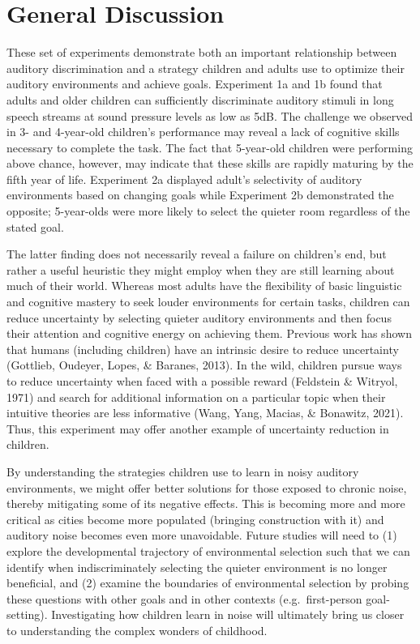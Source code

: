 \documentclass[10pt, letterpaper]{article}
\begin{document}
\hypertarget{general-discussion}{%
\section{\texorpdfstring{\textbf{General
Discussion}}{General Discussion}}\label{general-discussion}}

These set of experiments demonstrate both an important relationship
between auditory discrimination and a strategy children and adults use
to optimize their auditory environments and achieve goals. Experiment 1a
and 1b found that adults and older children can sufficiently
discriminate auditory stimuli in long speech streams at sound pressure
levels as low as 5dB. The challenge we observed in 3- and 4-year-old
children's performance may reveal a lack of cognitive skills necessary
to complete the task. The fact that 5-year-old children were performing
above chance, however, may indicate that these skills are rapidly
maturing by the fifth year of life. Experiment 2a displayed adult's
selectivity of auditory environments based on changing goals while
Experiment 2b demonstrated the opposite; 5-year-olds were more likely to
select the quieter room regardless of the stated goal.

The latter finding does not necessarily reveal a failure on children's
end, but rather a useful heuristic they might employ when they are still
learning about much of their world. Whereas most adults have the
flexibility of basic linguistic and cognitive mastery to seek louder
environments for certain tasks, children can reduce uncertainty by
selecting quieter auditory environments and then focus their attention
and cognitive energy on achieving them. Previous work has shown that
humans (including children) have an intrinsic desire to reduce
uncertainty (Gottlieb, Oudeyer, Lopes, \& Baranes, 2013). In the wild,
children pursue ways to reduce uncertainty when faced with a possible
reward (Feldstein \& Witryol, 1971) and search for additional
information on a particular topic when their intuitive theories are less
informative (Wang, Yang, Macias, \& Bonawitz, 2021). Thus, this
experiment may offer another example of uncertainty reduction in
children.

By understanding the strategies children use to learn in noisy auditory
environments, we might offer better solutions for those exposed to
chronic noise, thereby mitigating some of its negative effects. This is
becoming more and more critical as cities become more populated
(bringing construction with it) and auditory noise becomes even more
unavoidable. Future studies will need to (1) explore the developmental
trajectory of environmental selection such that we can identify when
indiscriminately selecting the quieter environment is no longer
beneficial, and (2) examine the boundaries of environmental selection by
probing these questions with other goals and in other contexts
(e.g.~first-person goal-setting). Investigating how children learn in
noise will ultimately bring us closer to understanding the complex
wonders of childhood.
\end{document}
